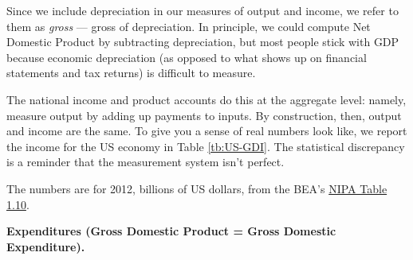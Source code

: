 Since we include depreciation in our measures of output and income,
we refer to them as \textit{gross} --- gross of depreciation.
In principle, we could compute Net Domestic Product
by subtracting depreciation, but most people stick with GDP because
economic depreciation (as opposed to what shows up on financial
statements and tax returns) is difficult to measure.


The national income and product accounts do this at the aggregate level:
namely, measure output by adding up payments to inputs.
By construction, then, output and income are the same.
To give you a sense of real numbers look like, we report
the income for the US economy  in Table \ref{tb:US-GDI}.
The statistical discrepancy is a reminder that the measurement
system isn't perfect.

\begin{table}[h!]
\centering
\caption{Income components of US GDP.}
\label{tb:US-GDI}

\begin{minipage}{0.7\textwidth}
\footnotesize{%
\smallskip
The numbers are for 2012, billions of US dollars,
from the BEA's
\href{http://www.bea.gov/iTable/iTableHtml.cfm?reqid=9&step=3&isuri=1&903=51}{NIPA Table 1.10}.
}
\end{minipage}
\end{table}


\textbf{Expenditures (Gross Domestic Product = Gross Domestic Expenditure).    }

